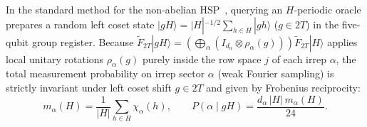 \documentclass[aps,prx,twocolumn,superscriptaddress,nofootinbib]{revtex4-2}
\begin{document}
In the standard method for the non-abelian HSP~\cite{MooreRockmoreRussell2006,EttingerHoyerKnill2004}, querying an $H$-periodic oracle prepares a random left coset state $|gH\rangle = |H|^{-1/2}\sum_{h \in H}|gh\rangle$ ($g \in 2T$) in the five-qubit group register. Because $\widetilde{F}_{2T}|gH\rangle = (\bigoplus_\alpha (I_{d_\alpha} \otimes \rho_\alpha(g)))\widetilde{F}_{2T}|H\rangle$ applies local unitary rotations $\rho_\alpha(g)$ purely inside the row space $j$ of each irrep $\alpha$, the total measurement probability on irrep sector $\alpha$ (weak Fourier sampling) is strictly invariant under left coset shift $g \in 2T$ and given by Frobenius reciprocity:
\begin{equation}
  m_\alpha(H) = \frac{1}{|H|}\sum_{h \in H}\chi_\alpha(h), \qquad
  P(\alpha \mid gH) = \frac{d_\alpha\,|H|\,m_\alpha(H)}{24}.
  \label{eq:frobenius_hsp}
\end{equation}
\end{document}
